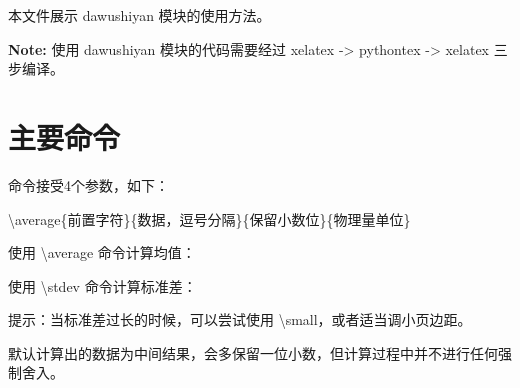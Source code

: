 \documentclass{article}
\begin{document}
  本文件展示 dawushiyan 模块的使用方法。

  \textbf{Note:} 使用 dawushiyan 模块的代码需要经过 xelatex -> pythontex -> xelatex 三步编译。

  \section*{主要命令}
  命令接受4个参数，如下：

  \textbackslash average\{前置字符\}\{数据，逗号分隔\}\{保留小数位\}\{物理量单位\}

  使用 \textbackslash average 命令计算均值：


  使用 \textbackslash stdev 命令计算标准差：


  提示：当标准差过长的时候，可以尝试使用 \textbackslash small，或者适当调小页边距。

  默认计算出的数据为中间结果，会多保留一位小数，但计算过程中并不进行任何强制舍入。
\end{document}
